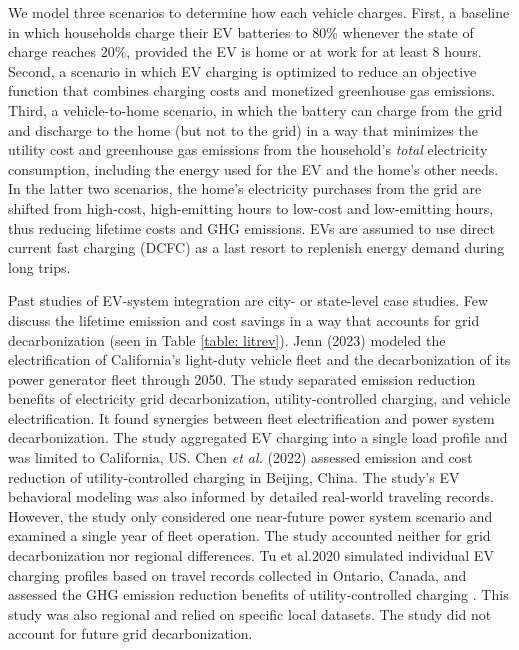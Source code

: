\documentclass[11pt,preprint]{elsarticle}
\begin{document}
We model three scenarios to determine how each vehicle charges. First, a baseline in which households charge their EV batteries to 80\% whenever the state of charge reaches 20\%, provided the EV is home or at work for at least 8 hours. Second, a scenario in which EV charging is optimized to reduce an objective function that combines charging costs and monetized greenhouse gas emissions. Third, a vehicle-to-home scenario, in which the battery can charge from the grid and discharge to the home (but not to the grid) in a way that minimizes the utility cost and greenhouse gas emissions from the household's \textit{total} electricity consumption, including the energy used for the EV and the home's other needs. In the latter two scenarios, the home's electricity purchases from the grid are shifted from high-cost, high-emitting hours to low-cost and low-emitting hours, thus reducing lifetime costs and GHG emissions. EVs are assumed to use direct current fast charging (DCFC) as a last resort to replenish energy demand during long trips.

Past studies of EV-system integration are city- or state-level case studies. Few discuss the lifetime emission and cost savings in a way that accounts for grid decarbonization (seen in Table \ref{table: litrev}). Jenn (2023) \cite{jenn_emissions_2023} modeled the electrification of California's light-duty vehicle fleet and the decarbonization of its power generator fleet through 2050. The study separated emission reduction benefits of electricity grid decarbonization, utility-controlled charging, and vehicle electrification. It found synergies between fleet electrification and power system decarbonization. The study aggregated EV charging into a single load profile and was limited to California, US. Chen \textit{et al.} (2022) \cite{chen_emission_2022} assessed emission and cost reduction of utility-controlled charging in Beijing, China. The study's EV behavioral modeling was also informed by detailed real-world traveling records. However, the study only considered one near-future power system scenario and examined a single year of fleet operation. The study accounted neither for grid decarbonization nor regional differences. Tu et al.2020 simulated individual EV charging profiles based on travel records collected in Ontario, Canada, and assessed the GHG emission reduction benefits of utility-controlled charging \cite{tu_electric_2020}. This study was also regional and relied on specific local datasets. The study did not account for future grid decarbonization.
\end{document}
